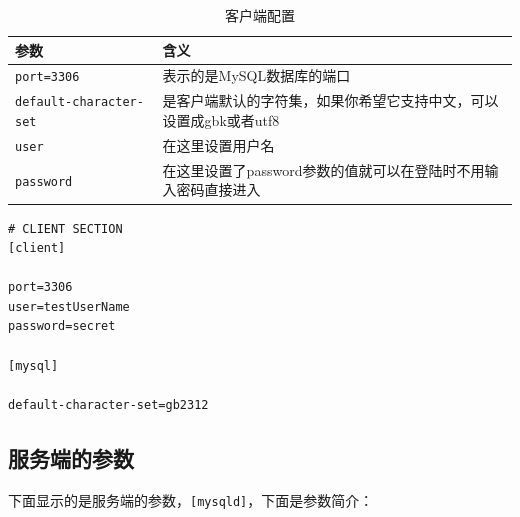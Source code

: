 \documentclass[UTF8,a4paper,12pt]{ctexbook}
\begin{document}
			\begin{table}[H]
				\centering
				\caption{客户端配置}
				\begin{tabular}{p{5cm}<{\centering}|p{12cm}<{\centering}}
					\toprule
						参数 &  含义 \\
					\midrule
						\verb|port=3306  | & 表示的是MySQL数据库的端口 \\
						\verb|default-character-set | & 是客户端默认的字符集，如果你希望它支持中文，可以设置成gbk或者utf8 \\
						\verb|user| & 在这里设置用户名\\
						\verb|password | & 在这里设置了password参数的值就可以在登陆时不用输入密码直接进入 \\
					\bottomrule
				\end{tabular}
			\end{table}	
			
			\begin{lstlisting}
# CLIENT SECTION
[client]

port=3306
user=testUserName
password=secret

[mysql]

default-character-set=gb2312			
			\end{lstlisting}
		
		\newpage
		\subsection{服务端的参数}	
			下面显示的是服务端的参数，\verb|[mysqld]|，下面是参数简介：
			
\end{document}
